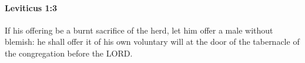 
		\paragraph{Leviticus 1:3} %
			\label{LEVITICUS-1-3}

			If his offering be a burnt sacrifice of the herd, let him offer a male without blemish: he shall offer it of his own voluntary will at the door of the tabernacle of the congregation before the LORD.


